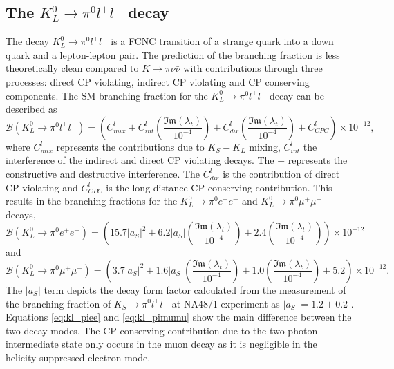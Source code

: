 \documentclass[../main.tex]{subfiles}
\begin{document}
    \subsection{The $K^0_L \to \pi^0 l^+l^-$ decay}\label{sec:kllep_theory}
    The decay $K^0_L \to \pi^0 l^+l^-$ is a \gls{FCNC} transition of a strange quark into a down quark and a lepton-lepton pair. The prediction of the branching fraction is less theoretically clean compared to $K \to \pi \nu \bar{\nu}$ with contributions through three processes: direct \gls{CP} violating, indirect \gls{CP} violating and \gls{CP} conserving components.
    The SM branching fraction for the $K^0_L \to \pi^0 l^+l^-$ decay can be described as \cite{Buchalla:2003sj,Isidori2004}
    \begin{equation}
        \mathcal{B}(K^0_L \to \pi^0 l^+l^-) = \left(C^l_{mix} \pm C^l_{int} \left(\frac{\mathfrak{Im}(\lambda_t)}{10^{-4}}\right) + C^l_{dir} \left(\frac{\mathfrak{Im}(\lambda_t)}{10^{-4}}\right) + C^l_{CPC} \right) \times 10^{-12},
    \end{equation}
    where $C^l_{mix}$ represents the contributions due to $K_S - K_L$ mixing, $C^l_{int}$ the interference of the indirect and direct \gls{CP} violating decays. The $\pm$ represents the constructive and destructive interference. The $C^l_{dir}$ is the contribution of direct \gls{CP} violating and $C^l_{CPC}$ is the long distance \gls{CP} conserving contribution. 
    This results in the branching fractions for the $K^0_L \to \pi^0 e^+e^-$ and $K^0_L \to \pi^0 \mu^+\mu^-$ decays, 
    \begin{equation} \label{eq:kl_piee}
        \mathcal{B}(K^0_L \to \pi^0 e^+e^-) = \left(15.7|a_S|^2 \pm 6.2 |a_S| \left(\frac{\mathfrak{Im}(\lambda_t)}{10^{-4}}\right) + 2.4 \left(\frac{\mathfrak{Im}(\lambda_t)}{10^{-4}}\right) \right) \times 10^{-12}
    \end{equation}
    and 
    \begin{equation} \label{eq:kl_pimumu}
        \mathcal{B}(K^0_L \to \pi^0 \mu^+\mu^-) = \left(3.7|a_S|^2 \pm 1.6 |a_S| \left(\frac{\mathfrak{Im}(\lambda_t)}{10^{-4}}\right) + 1.0\left(\frac{\mathfrak{Im}(\lambda_t)}{10^{-4}}\right) + 5.2 \right) \times 10^{-12}.
    \end{equation}
    The $|a_S|$ term depicts the decay form factor calculated from the measurement of the branching fraction of $K_S \to \pi^0 l^+l^-$ at NA48/1 experiment as $|a_S| = 1.2 \pm 0.2$ \cite{NA481:2003cfm, NA481:2004nbc}.
    Equations \ref{eq:kl_piee} and \ref{eq:kl_pimumu} show the main difference between the two decay modes. The \gls{CP} conserving contribution due to the two-photon intermediate state only occurs in the muon decay as it is negligible in the helicity-suppressed electron mode.
\end{document}
